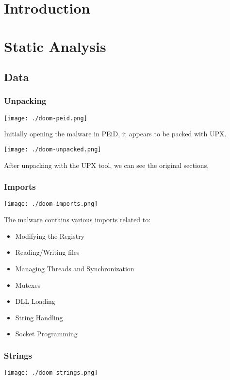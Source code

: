 \documentclass[11pt]{article}
\date{\today}
\title{}
\begin{document}
\tableofcontents

\section{Introduction}
\label{sec:org69df4be}
\section{Static Analysis}
\label{sec:orge847be5}
\subsection{Data}
\label{sec:orga5e2aa6}
\subsubsection{Unpacking}
\label{sec:orgad3bd05}
\begin{center}
\texttt{[image: ./doom-peid.png]}
\end{center}

Initially opening the malware in PEiD, it appears to be packed with
UPX.

\begin{center}
\texttt{[image: ./doom-unpacked.png]}
\end{center}

After unpacking with the UPX tool, we can see the original sections.
\subsubsection{Imports}
\label{sec:orgedb304f}
\begin{center}
\texttt{[image: ./doom-imports.png]}
\end{center}

The malware contains various imports related to:
\begin{itemize}
\item Modifying the Registry
\item Reading/Writing files
\item Managing Threads and Synchronization
\item Mutexes
\item DLL Loading
\item String Handling
\item Socket Programming
\end{itemize}
\subsubsection{Strings}
\label{sec:org5898797}
\begin{center}
\texttt{[image: ./doom-strings.png]}
\end{center}
\end{document}
